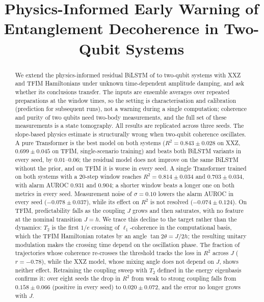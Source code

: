 \documentclass[twocolumn,10pt]{article}
\title{\textbf{Physics-Informed Early Warning of Entanglement Decoherence
in Two-Qubit Systems}}
\author[1]{}
\affil[1]{\needspaste{confirm this affiliation or replace it}}
\date{}
\begin{document}
\maketitle

\begin{abstract}
We extend the physics-informed residual BiLSTM of
\cite{Paper1Brusnikin} to two-qubit systems with XXZ and TFIM
Hamiltonians under unknown time-dependent amplitude damping, and ask
whether its conclusions transfer.
The inputs are ensemble averages over repeated preparations at the window
times, so the setting is characterisation and calibration (prediction for
subsequent runs), not a warning during a single computation; coherence
and purity of two qubits need two-body measurements, and the full set of
these measurements is a state tomography.
All results are replicated across three seeds.
The slope-based physics estimate is structurally wrong when two-qubit
coherence oscillates. A pure Transformer is the best model on both
systems ($R^2 = 0.843 \pm 0.028$ on XXZ, $0.699 \pm 0.045$ on TFIM,
single-scenario training) and beats both BiLSTM variants in every seed,
by $0.01$--$0.06$; the residual model does not improve on the same BiLSTM
without the prior, and on TFIM it is worse in every seed.
A single Transformer trained on both systems with a 20-step window
reaches $R^2 = 0.814 \pm 0.034$ and $0.703 \pm 0.034$, with alarm AUROC
$0.931$ and $0.904$; a shorter window beats a longer one on both metrics
in every seed.
Measurement noise of $\sigma = 0.10$ lowers the alarm AUROC in every seed
($-0.078 \pm 0.037$), while its effect on $R^2$ is not resolved
($-0.074 \pm 0.124$).
On TFIM, predictability falls as the coupling $J$ grows and then
saturates, with no feature at the nominal transition $J = h$.
We trace this decline to the target rather than the dynamics: $T_2$ is
the first $1/e$ crossing of $\ell_1$-coherence in the computational
basis, which the TFIM Hamiltonian rotates by an angle
$\tan 2\theta = J/2h$; the resulting unitary modulation makes the
crossing time depend on the oscillation phase. The fraction of
trajectories whose coherence re-crosses the threshold tracks the loss in
$R^2$ across $J$ ($r = -0.78$), while the XXZ model, whose mixing angle
does not depend on $J$, shows neither effect.
Retraining the coupling sweep with $T_2$ defined in the energy
eigenbasis confirms it: over eight seeds the drop in $R^2$ from weak to
strong coupling falls from $0.158 \pm 0.066$ (positive in every seed) to
$0.020 \pm 0.072$, and the error no longer grows with $J$.

\end{abstract}
\end{document}
